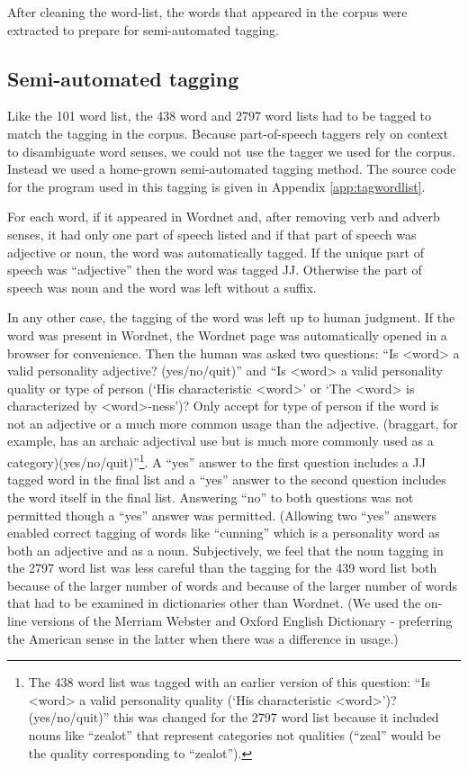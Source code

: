 \documentclass[eric_thesis.tex]{subfiles}
\begin{document}
After cleaning the word-list, the words that appeared in the corpus were 
extracted to prepare for semi-automated tagging.

\subsection{Semi-automated tagging}

Like the 101 word list, the 438 word and 2797 word lists had to be tagged to 
match the tagging in the corpus. Because part-of-speech taggers rely on context 
to disambiguate word senses, we could not use the tagger we used for the 
corpus. Instead we used a home-grown semi-automated tagging method. The source 
code for the program used in this tagging is given in 
Appendix \ref{app:tagwordlist}. 

For each word, if it appeared in Wordnet  and, after
removing verb and adverb senses, it had only one part of speech listed and if 
that part of speech was adjective or noun, the word was automatically tagged. 
If the unique part of speech was ``adjective'' then the word was tagged JJ. 
Otherwise the part of speech was noun and the word was left without a suffix.

In any other case, the tagging of the word was left up to human judgment. If the
word was present in Wordnet, the Wordnet page was automatically opened in a 
browser for convenience. Then the human was asked two questions:
``Is <word> a valid personality adjective? (yes/no/quit)'' and ``Is <word> a 
valid personality quality or type of person (`His characteristic <word>' or 
`The <word> is characterized by <word>-ness')? Only accept for type of person 
if the word is not an adjective or a much more common usage than the adjective. 
(braggart, for example, has an archaic adjectival use but is much more commonly 
used as a category)(yes/no/quit)''\footnote{The 438 word list was tagged with an
earlier version of this question: ``Is <word> a valid personality quality 
(`His characteristic <word>')? (yes/no/quit)'' this was changed for the 2797 
word list because it included nouns like ``zealot'' that represent categories
not qualities (``zeal'' would be the quality corresponding to ``zealot'').}. A 
``yes'' answer to the first question includes a JJ tagged word in the final list
and a ``yes'' answer to the second question includes the word itself in the
final list. Answering ``no'' to both questions was not permitted though a 
``yes'' answer was permitted. (Allowing two ``yes'' answers enabled correct 
tagging of words like ``cunning'' which is a personality word as both an 
adjective and as a noun. Subjectively, we feel that the noun tagging in the 2797
word list was less careful than the tagging for the 439 word list both because
of the larger number of words and because of the larger number of words that
had to be examined in dictionaries other than Wordnet. (We used the on-line
versions of the Merriam Webster and Oxford English Dictionary - preferring the
American sense in the latter when there was a difference in usage.)
\end{document}
